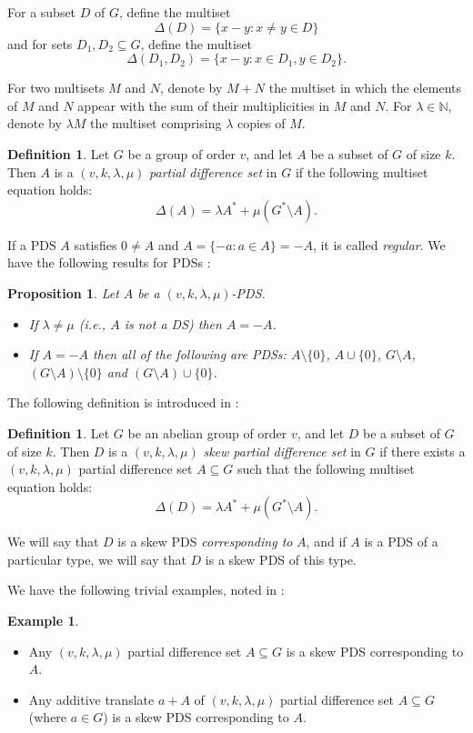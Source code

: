 \documentclass[12pt, a4paper]{article}
\newtheorem{proposition}[theorem]{Proposition}
\theoremstyle{definition}
\newtheorem{example}[theorem]{Example}
\newtheorem{definition}[theorem]{Definition}
\begin{document}
For a subset $D$ of $G$, define the multiset 
$$\Delta(D)=\{ x-y: x \neq y \in D \}$$
and for sets $D_1, D_2 \subseteq G$, define the multiset 
$$\Delta(D_1, D_2)=\{ x-y: x \in D_1, y \in D_2 \}.$$  

For two multisets $M$ and $N$, denote by $M+N$ the multiset in which the elements of $M$ and $N$ appear with the sum of their multiplicities in $M$ and $N$.  For $\lambda \in \mathbb{N}$, denote by $\lambda M$ the multiset comprising $\lambda$ copies of $M$.

\begin{definition}
Let $G$ be a group of order $v$, and let $A$ be a subset of $G$ of size $k$. Then $A$ is a $(v,k,\lambda,\mu)$ \emph{partial difference set} in $G$ if the following multiset equation holds:
$$\Delta(A)=\lambda A^* + \mu (G^*\setminus A).$$
\end{definition}

If a PDS $A$ satisfies $0 \neq A$ and $A=\{-a: a \in A \}=-A$, it is called \emph{regular}.  We have the following results for PDSs \cite{HucJoh, Ma94}:
\begin{proposition}
Let $A$ be a $(v,k,\lambda,\mu)$-PDS.
\begin{itemize}
\item[(i)] If $\lambda \neq \mu$ (i.e., $A$ is not a DS) then $A=-A$.
\item[(ii)] If $A=-A$ then all of the following are PDSs: $A \setminus \{0\}$, $A \cup \{0\}$, $G \setminus A$, $(G \setminus A) \setminus \{0\}$ and $(G \setminus A) \cup \{0\}$.
\end{itemize}
\end{proposition}

The following definition is introduced in \cite{AnbKalMei}:
\begin{definition}
Let $G$ be an abelian group of order $v$, and let $D$ be a subset of $G$ of size $k$. Then $D$ is a $(v,k,\lambda,\mu)$ \emph{skew partial difference set} in $G$ if there exists a $(v,k,\lambda,\mu)$ partial difference set $A \subseteq G$ such that the following multiset equation holds:
$$\Delta(D)=\lambda A^* + \mu (G^*\setminus A).$$
\end{definition}
We will say that $D$ is a skew PDS \emph{corresponding to} $A$, and if $A$ is a PDS of a particular type, we will say that $D$ is a skew PDS of this type.

We have the following trivial examples, noted in \cite{AnbKalMei}:
\begin{example}
\begin{itemize}
\item[(i)] Any $(v,k,\lambda,\mu)$ partial difference set $A \subseteq G$ is a skew PDS corresponding to $A$.
\item[(ii)] Any additive translate $a+A$ of $(v,k,\lambda,\mu)$ partial difference set $A \subseteq G$ (where $a \in G$) is a skew PDS corresponding to $A$.
\end{itemize}
\end{example}
\end{document}
